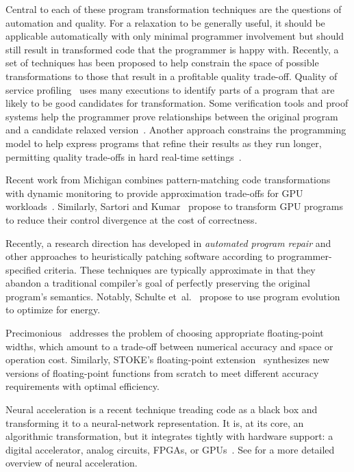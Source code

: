 Central to each of these program transformation techniques are the questions
of automation and quality. For a relaxation to be generally useful, it should
be applicable automatically with only minimal programmer involvement but
should still result in transformed code that the programmer is happy with.
Recently, a set of techniques has been proposed to help constrain the space
of possible transformations to those that result in a profitable
quality trade-off. Quality of service profiling~\cite{qosprof} uses many
executions to identify parts of a program that are likely to be good
candidates for transformation. Some verification tools and proof systems help
the programmer prove relationships between the original program and a
candidate relaxed version~\cite{carbin-pldi, carbin-races, carbin-pepm,
rice-transformation-semantics}.
Another approach constrains the programming model to help express programs
that refine their results as they run longer, permitting quality trade-offs in
hard real-time settings~\cite{chung90}.

Recent work from Michigan combines pattern-matching code transformations with
dynamic monitoring to provide approximation trade-offs for GPU
workloads~\cite{paraprox, sage}.
Similarly, Sartori and Kumar~\cite{herding} propose to transform GPU programs
to reduce their control divergence at the cost of correctness.

Recently, a research direction has developed in \emph{automated program
repair} and other approaches to heuristically patching software according to
programmer-specified criteria.
These techniques are typically approximate in that they abandon a traditional
compiler's goal of perfectly preserving the original program's semantics.
Notably, Schulte et~al.~\cite{schulte} propose to use program evolution to
optimize for energy.

Precimonious~\cite{precimonious} addresses the problem of choosing appropriate
floating-point widths, which amount to a trade-off between numerical accuracy
and space or operation cost.
Similarly, STOKE's floating-point extension~\cite{stoke-fp} synthesizes new
versions of floating-point functions from scratch to meet different accuracy
requirements with optimal efficiency.

Neural acceleration is a recent technique treading code as a black box and
transforming it to a neural-network representation.
It is, at its core, an algorithmic transformation, but it integrates tightly
with hardware support: a digital accelerator, analog circuits, FPGAs, or
GPUs~\cite{npu, anpu, snnap, neuralgpu}.
See  for a more detailed overview of neural acceleration.


